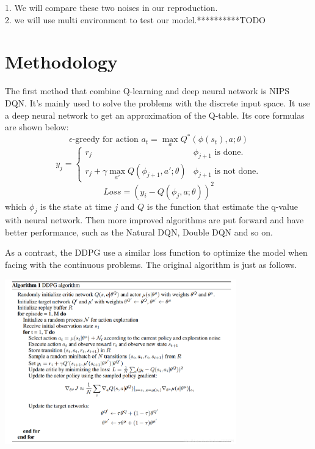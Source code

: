 \documentclass[a4paper,12pt,oneside,article]{memoir}
\begin{document}
1. We will compare these two noises in our reproduction. \\
2. we will use multi environment to test our model.**********TODO

\chapter{Methodology}
The first method that combine Q-learning and deep neural network is NIPS DQN. It's mainly used to solve the problems with the discrete input space. It use a deep neural network to get an approximation of the Q-table. Its core formulas are shown below:
\begin{equation*}
\epsilon \text{-greedy for action } a_t=\max_a Q^*(\phi(s_t), a;\theta)
\end{equation*}
\begin{equation*}
y_j=
	\begin{cases}
	r_j & \phi_{j+1} \text{ is done.}\\
	r_j+\gamma \max_{a'}Q(\phi_{j+1},a';\theta) & \phi_{j+1} \text{ is not done.}
	\end{cases}
\end{equation*}
\begin{equation*}
Loss = (y_i - Q(\phi_j,a;\theta))^2
\end{equation*}
which $\phi_j$ is the state at time $j$ and $Q$ is the function that estimate the q-value with neural network. Then more improved algorithms are put forward and have better performance, such as the Natural DQN, Double DQN and so on.

As a contrast, the DDPG use a similar loss function to optimize the model when facing with the continuous problems. The original algorithm is just as follows.

\begin{center}
\includegraphics[width=10cm]{DDPG.png}
\label{fig:smiley}
\end{center}
\end{document}
